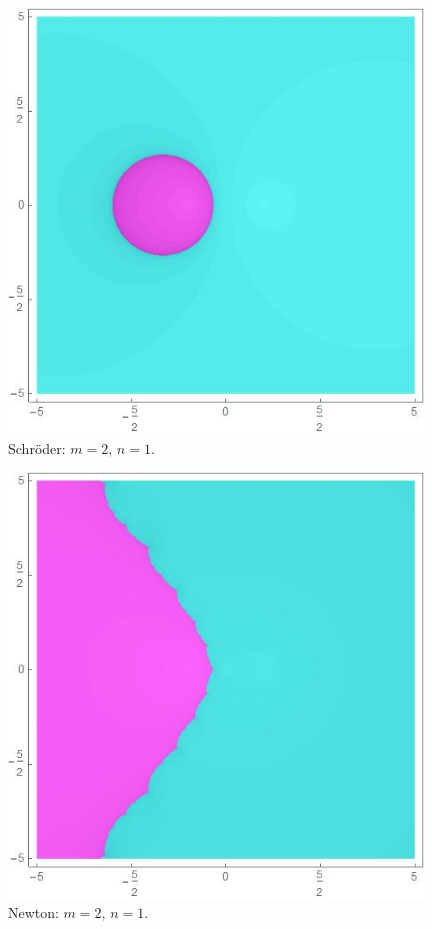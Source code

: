 \begin{figure}[H]
\centering 
\begin{minipage}[t]{0.45\textwidth}
\centering
\includegraphics[width=0.98\textwidth]{fuentes/articulo-cuadraticos/imagenes/sch_m_2n_1.jpg}
\small Schröder: $m=2, \, n=1.$
\end{minipage}\hfill
\begin{minipage}[t]{0.45\textwidth}
\centering
\includegraphics[width=0.98\textwidth]{fuentes/articulo-cuadraticos/imagenes/newton_m_2n_1.jpg}
\small Newton: $m=2, \, n=1.$
\end{minipage}


\end{figure}
